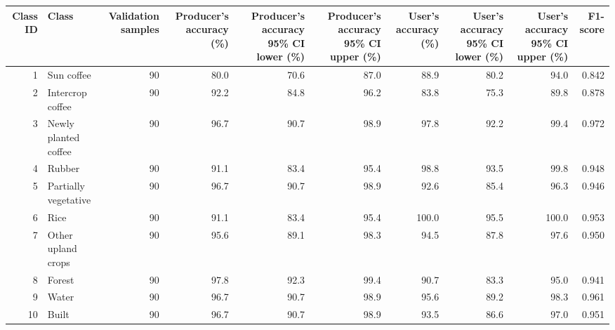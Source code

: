 \begin{tabular}{rlrrrrrrrr}
\toprule
Class ID & Class & Validation samples & Producer's accuracy (\%) & Producer's accuracy 95\% CI lower (\%) & Producer's accuracy 95\% CI upper (\%) & User's accuracy (\%) & User's accuracy 95\% CI lower (\%) & User's accuracy 95\% CI upper (\%) & F1-score \\
\midrule
1 & Sun coffee & 90 & 80.0 & 70.6 & 87.0 & 88.9 & 80.2 & 94.0 & 0.842 \\
2 & Intercrop coffee & 90 & 92.2 & 84.8 & 96.2 & 83.8 & 75.3 & 89.8 & 0.878 \\
3 & Newly planted coffee & 90 & 96.7 & 90.7 & 98.9 & 97.8 & 92.2 & 99.4 & 0.972 \\
4 & Rubber & 90 & 91.1 & 83.4 & 95.4 & 98.8 & 93.5 & 99.8 & 0.948 \\
5 & Partially vegetative & 90 & 96.7 & 90.7 & 98.9 & 92.6 & 85.4 & 96.3 & 0.946 \\
6 & Rice & 90 & 91.1 & 83.4 & 95.4 & 100.0 & 95.5 & 100.0 & 0.953 \\
7 & Other upland crops & 90 & 95.6 & 89.1 & 98.3 & 94.5 & 87.8 & 97.6 & 0.950 \\
8 & Forest & 90 & 97.8 & 92.3 & 99.4 & 90.7 & 83.3 & 95.0 & 0.941 \\
9 & Water & 90 & 96.7 & 90.7 & 98.9 & 95.6 & 89.2 & 98.3 & 0.961 \\
10 & Built & 90 & 96.7 & 90.7 & 98.9 & 93.5 & 86.6 & 97.0 & 0.951 \\
\bottomrule
\end{tabular}
